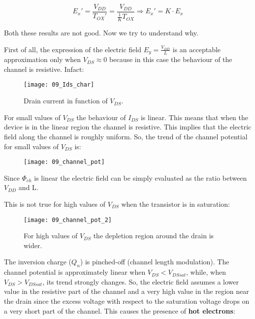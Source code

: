 \documentclass[a4paper, 12pt, twoside, openright]{report}
\begin{document}
	\begin{equation}
	E_x' = \frac{V_{DD}}{T_{OX}'} = \frac{V_{DD}}{\frac{1}{K}T_{OX}} \Rightarrow E_x' = K \cdot E_x
	\label{}
	\end{equation}

Both these results are not good. Now we try to understand why.

First of all, the expression of the electric field $E_y = \frac{V_{DD}}{L}$ is an acceptable approximation only when $V_{DS} \approx 0$ because in this case the behaviour of the channel is resistive. Infact:

	\begin{figure}[H]
	\centering
	\texttt{[image: 09\_Ids\_char]}
	\caption{Drain current in function of $V_{DS}$.}
	\label{}
	\end{figure}

For small values of $V_{DS}$ the behaviour of $I_{DS}$ is linear. This means that when the device is in the linear region the channel is resistive. This implies that the electric field along the channel is roughly uniform. So, the trend of the channel potential for small values of $V_{DS}$ is:

	\begin{figure}[H]
	\centering
	\texttt{[image: 09\_channel\_pot]}
	\caption{}
	\label{}
	\end{figure}

Since $\Phi_{ch}$ is linear the electric field can be simply evaluated as the ratio between $V_{DD}$ and L.

This is not true for high values of $V_{DS}$ when the transistor is in saturation:

	\begin{figure}[H]
	\centering
	\texttt{[image: 09\_channel\_pot\_2]}
	\caption{For high values of $V_{DS}$ the depletion region around the drain is wider.}
	\label{}
	\end{figure}

The inversion charge ($Q_{n}$) is pinched-off (channel length modulation). The channel potential is approximately linear when $V_{DS} < V_{DSsat}$, while, when $V_{DS} > V_{DSsat}$, its trend strongly changes. So, the electric field assumes a lower value in the resistive part of the channel and a very high value in the region near the drain since the excess voltage with respect to the saturation voltage drops on a very short part of the channel. This causes the presence of \textbf{hot electrons}:

\newpage
\end{document}
